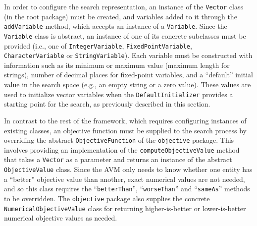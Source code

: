 \documentclass{llncs}
\newcommand{\inlineheading}[1]{\vspace{1mm} \noindent {\bf #1.}}
\begin{document}
\begin{sloppypar} \inlineheading{Representation} In order to configure the search representation, an instance of the {\tt Vector} class (in the root package) must be created, and variables added to it through the {\tt addVariable} method, which accepts an instance of a {\tt Variable}. Since the {\tt Variable} class is abstract, an instance of one of its concrete subclasses must be provided (i.e., one of {\tt IntegerVariable}, {\tt FixedPointVariable}, {\tt CharacterVariable} or {\tt StringVariable}). Each variable must be constructed with information such as its minimum or maximum value (maximum length for strings), number of decimal places for fixed-point variables, and a ``default'' initial value in the search space (e.g., an empty string or a zero value). These values are used to initialize vector variables when the {\tt DefaultInitializer} provides a starting point for the search, as previously described in this section.
\end{sloppypar}


\begin{sloppypar} \inlineheading{Objective Function} In contrast to the rest of the framework, which requires configuring instances of existing classes, an objective function must be supplied to the search process by overriding the abstract {\tt ObjectiveFunction} of the {\tt objective} package. This involves providing an implementation of the {\tt computeObjectiveValue} method that takes a {\tt Vector} as a parameter and returns an instance of the abstract {\tt ObjectiveValue} class. Since the AVM only needs to know whether one entity has a ``better'' objective value than another, exact numerical values are not needed, and so this class requires the ``{\tt betterThan}'', ``{\tt worseThan}'' and ``{\tt sameAs}'' methods to be overridden.
The {\tt objective} package also supplies the concrete {\tt NumericalObjectiveValue} class for returning higher-is-better or lower-is-better numerical objective values as needed.
\end{sloppypar}
\end{document}
